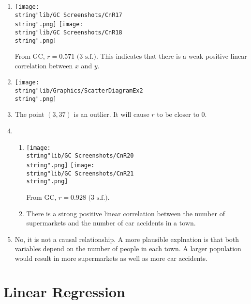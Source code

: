 \documentclass[11pt,a4paper]{book}
\begin{document}
\begin{example}
\Solution

\begin{enumerate}[label=(\alph*)]

\item  \texttt{[image: \\string"lib/GC Screenshots/CnR17\\string".png]}
\hspace{1cm}\texttt{[image: \\string"lib/GC Screenshots/CnR18\\string".png]}

From GC, $r=0.571\text{ (3 s.f.)}$. This indicates that there is
a weak positive linear correlation between $x$ and $y$.

\item  \texttt{[image: \\string"lib/Graphics/ScatterDiagramEx2\\string".png]}

\item  The point $\left(3,37\right)$ is an outlier. It will cause
$r$ to be closer to $0$.

\item  \begin{enumerate}[label=(\roman*)]

\item  \texttt{[image: \\string"lib/GC Screenshots/CnR20\\string".png]}
\hspace{1cm}\texttt{[image: \\string"lib/GC Screenshots/CnR21\\string".png]}

From GC, $r=0.928\text{ (3 s.f.)}$.

\item  There is a strong positive linear correlation between the
number of supermarkets and the number of car accidents in a town.

\end{enumerate}

\item  No, it is not a causal relationship. A more plausible explnation
is that both variables depend on the number of people in each town.
A larger population would result in more supermarkets as well as more
car accidents.

\end{enumerate}

\end{example}

\newpage

\section{Linear Regression}
\end{document}
